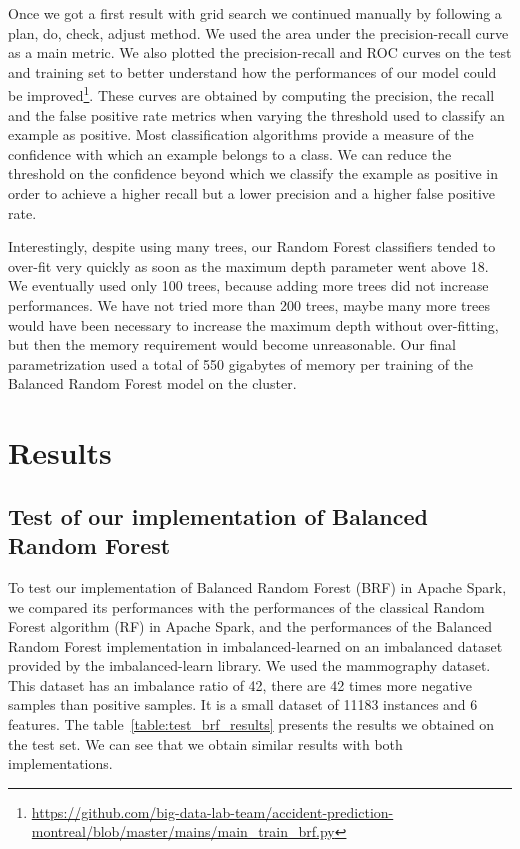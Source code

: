 \documentclass[conference]{IEEEtran}
\begin{document}
Once we got a first result with grid search we continued manually by
following a plan, do, check, adjust method. We used the area under the precision-recall curve as a main metric. We also plotted the precision-recall and ROC curves on the test and training set to better understand how the performances of our model could be improved\footnote{\url{https://github.com/big-data-lab-team/accident-prediction-montreal/blob/master/mains/main\_train\_brf.py}}. These curves are obtained by computing the precision, the recall and the false positive rate metrics when varying the threshold used to classify an example as positive. Most classification algorithms provide a measure of the confidence with which an example belongs to a class. We can reduce the threshold on the confidence beyond which we classify the example as positive in order to achieve a higher recall but a lower precision and a higher false positive rate.

Interestingly, despite using many trees, our Random Forest classifiers
tended to over-fit very quickly as soon as the maximum depth parameter went
above 18. We eventually used only 100 trees, because adding more trees did
not increase performances. We have not tried more than 200 trees, maybe
many more trees would have been necessary to increase the maximum depth
without over-fitting, but then the memory requirement would become unreasonable.
Our final parametrization used a total of 550 gigabytes of memory per training of the Balanced Random Forest model on the cluster.

\section{Results}

\subsection{Test of our implementation of Balanced Random Forest}
To test our implementation of Balanced Random Forest (BRF) in Apache Spark, we compared its performances with the performances of the classical Random Forest algorithm (RF) in Apache Spark, and the performances of the Balanced Random Forest implementation in 
imbalanced-learned\cite{imbalance} on an imbalanced dataset provided by the imbalanced-learn library. We used the mammography dataset. This dataset has an imbalance ratio of 42, there are 42 times more negative samples than positive samples. It is a small dataset of 11183 instances and 6 features. The table~\ref{table:test_brf_results} presents the results we obtained on the test set. We can see that we obtain similar results with both implementations.
\end{document}
